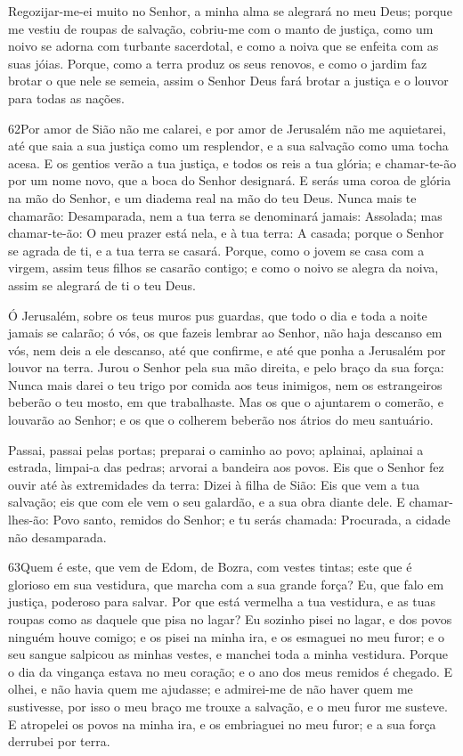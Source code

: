 Regozijar-me-ei muito no Senhor, a minha alma se alegrará no meu
Deus; porque me vestiu de roupas de salvação, cobriu-me com o manto
de justiça, como um noivo se adorna com turbante sacerdotal, e como
a noiva que se enfeita com as suas jóias. Porque, como a
terra produz os seus renovos, e como o jardim faz brotar o que nele
se semeia, assim o Senhor Deus fará brotar a justiça e o louvor para
todas as nações.

\medskip

\lettrine{62}{}Por amor de Sião não me calarei, e por amor de
Jerusalém não me aquietarei, até que saia a sua justiça como um
resplendor, e a sua salvação como uma tocha acesa. E os gentios
verão a tua justiça, e todos os reis a tua glória; e chamar-te-ão
por um nome novo, que a boca do Senhor designará. E serás uma
coroa de glória na mão do Senhor, e um diadema real na mão do teu
Deus. Nunca mais te chamarão: Desamparada, nem a tua terra se
denominará jamais: Assolada; mas chamar-te-ão: O meu prazer está
nela, e à tua terra: A casada; porque o Senhor se agrada de ti, e a
tua terra se casará. Porque, como o jovem se casa com a virgem,
assim teus filhos se casarão contigo; e como o noivo se alegra da
noiva, assim se alegrará de ti o teu Deus.

Ó Jerusalém, sobre os teus muros pus guardas, que todo o dia e
toda a noite jamais se calarão; ó vós, os que fazeis lembrar ao
Senhor, não haja descanso em vós, nem deis a ele descanso, até
que confirme, e até que ponha a Jerusalém por louvor na terra.
Jurou o Senhor pela sua mão direita, e pelo braço da sua força:
Nunca mais darei o teu trigo por comida aos teus inimigos, nem os
estrangeiros beberão o teu mosto, em que trabalhaste. Mas os que
o ajuntarem o comerão, e louvarão ao Senhor; e os que o colherem
beberão nos átrios do meu santuário.

Passai, passai pelas portas; preparai o caminho ao povo;
aplainai, aplainai a estrada, limpai-a das pedras; arvorai a
bandeira aos povos. Eis que o Senhor fez ouvir até às
extremidades da terra: Dizei à filha de Sião: Eis que vem a tua
salvação; eis que com ele vem o seu galardão, e a sua obra diante
dele. E chamar-lhes-ão: Povo santo, remidos do Senhor; e tu
serás chamada: Procurada, a cidade não desamparada.

\medskip

\lettrine{63}{}Quem é este, que vem de Edom, de Bozra, com
vestes tintas; este que é glorioso em sua vestidura, que marcha com
a sua grande força? Eu, que falo em justiça, poderoso para salvar.
Por que está vermelha a tua vestidura, e as tuas roupas como as
daquele que pisa no lagar? Eu sozinho pisei no lagar, e dos
povos ninguém houve comigo; e os pisei na minha ira, e os esmaguei
no meu furor; e o seu sangue salpicou as minhas vestes, e manchei
toda a minha vestidura. Porque o dia da vingança estava no meu
coração; e o ano dos meus remidos é chegado. E olhei, e não
havia quem me ajudasse; e admirei-me de não haver quem me
sustivesse, por isso o meu braço me trouxe a salvação, e o meu furor
me susteve. E atropelei os povos na minha ira, e os embriaguei
no meu furor; e a sua força derrubei por terra.

